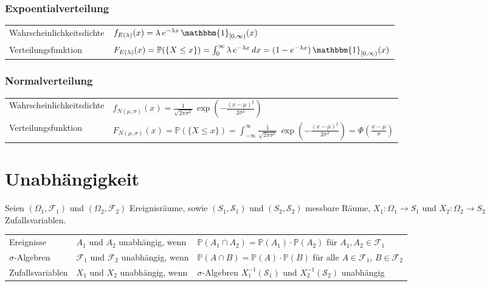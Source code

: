 \documentclass{article}
\begin{document}
\subsubsection*{Expoentialverteilung}

\begin{tabular}{ll}
Wahrscheinlichkeitsdichte & $f_{E(\lambda)}(x) = \lambda\,e^{-\lambda x}\, \mathbbm{1}_{[0,\infty)}(x)$ \\
Verteilungsfunktion & $F_{E(\lambda)}(x) = \mathbb{P}(\{X \le x\}) = \int_0^{\infty} \lambda\,e^{-\lambda x}\, dx = (1 - e^{-\lambda x})\, \mathbbm{1}_{[0,\infty)}(x)$ \\
\end{tabular}

\subsubsection*{Normalverteilung}

\begin{tabular}{ll}
Wahrscheinlichkeitsdichte & $f_{N(\mu,\sigma)}(x) = \frac{1}{\sqrt{2\pi \sigma^2}}\, \exp\left( -\frac{(x-\mu)^2}{2\sigma^2} \right)$ \\
Verteilungsfunktion & $F_{N(\mu,\sigma)}(x) = \mathbb{P}(\{X \le x\}) = \int_{-\infty}^{\infty} \frac{1}{\sqrt{2\pi \sigma^2}}\, \exp\left( -\frac{(x-\mu)^2}{2\sigma^2} \right) = \Phi(\frac{x-\mu}{\sigma})$ \\
\end{tabular}

\section{Unabhängigkeit}

Seien $(\Omega_1, \mathcal{F_1})$ und $(\Omega_2, \mathcal{F_2})$ Ereignisräume, sowie $(S_1, \mathcal{S_1})$ und $(S_2, \mathcal{S_2})$ messbare Räume, $X_1: \Omega_1 \longrightarrow S_1$ und $X_2: \Omega_2 \longrightarrow S_2$ Zufallsvariablen.

\begin{tabular}{lll}
Ereignisse & $A_1$ und $A_2$ unabhängig, wenn & $\mathbb{P}(A_1 \cap A_2) = \mathbb{P}(A_1) \cdot \mathbb{P}(A_2)$ für $A_1,A_2 \in \mathcal{F_1}$ \\
$\sigma$-Algebren & $\mathcal{F_1}$ und $\mathcal{F_2}$ unabhängig, wenn & $\mathbb{P}(A \cap B) = \mathbb{P}(A) \cdot \mathbb{P}(B)$ für alle $A \in \mathcal{F_1}$, $B \in \mathcal{F_2}$ \\
Zufallsvariablen & $X_1$ und $X_2$ unabhängig, wenn &  $\sigma$-Algebren $X^{-1}_1(\mathcal{S_1})$ und $X^{-1}_2(\mathcal{S_2})$ unabhängig \\
\end{tabular}
\end{document}
